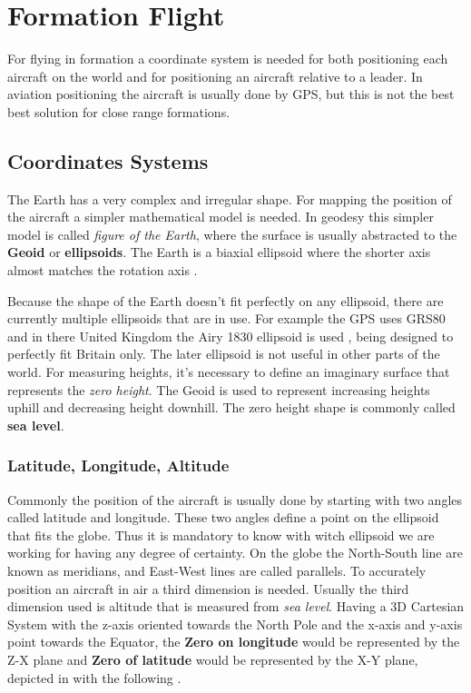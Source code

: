 \chapter{Formation Flight}
\label{chapter:formation-flight}
For flying in formation a coordinate system is needed for both positioning each 
aircraft on the world and for positioning an aircraft relative to a leader. In
aviation positioning the aircraft is usually done by GPS, but this is not the best best solution for close range formations.

\section{Coordinates Systems}
\label{sec:coordinates-systems}
The Earth has a very complex and irregular shape. For mapping the position of
the aircraft a simpler mathematical model is needed. In geodesy this simpler
model is called \textit{figure of the Earth}, where the surface is usually
abstracted to the \textbf{Geoid} or \textbf{ellipsoids}. The Earth is a biaxial 
ellipsoid where the shorter axis almost matches the rotation axis \cite{gb-coordinates}.

Because the shape of the Earth doesn't fit perfectly on any ellipsoid, there
are currently multiple ellipsoids that are in use. For example the GPS uses
GRS80 \cite{gsr80} and in there
United Kingdom the Airy 1830 ellipsoid is used \cite{gb-coordinates},  being 
designed to perfectly fit Britain only. The later ellipsoid is not useful in 
other parts of the world. For measuring heights, it's necessary to define an
imaginary surface that represents the \textit{zero height}. The Geoid is used
to represent increasing heights uphill and decreasing height downhill. The
zero height shape is commonly called \textbf{sea level}.

\subsection{Latitude, Longitude,  Altitude}
\label{sub-sec:lla}
Commonly the position of the aircraft is usually done by starting with 
two angles called latitude and longitude. These two angles define a point
on the ellipsoid that fits the globe. Thus it is mandatory to know with witch
ellipsoid we are working for having any degree of certainty. On the globe
the North-South line are known as meridians,  and East-West lines are called 
parallels. To accurately position an aircraft in air a third dimension is needed.
Usually the third dimension used is altitude that is measured from \textit{sea level}.
Having a 3D Cartesian System with the z-axis oriented towards the North Pole and
the x-axis and y-axis point towards the Equator, the \textbf{Zero on longitude}
would be represented by the Z-X plane and \textbf{Zero of latitude} would be 
represented by the X-Y plane, depicted in \cite{gb-coordinates} with the following
.
% 
\newpage

